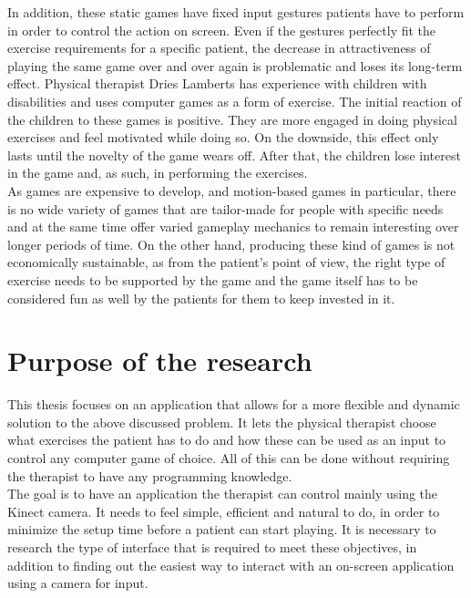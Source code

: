 In addition, these static games have fixed input gestures patients have to perform in order to control the action on screen. Even if the gestures perfectly fit the exercise requirements for a specific patient, the decrease in attractiveness of playing the same game over and over again is problematic and loses its long-term effect. Physical therapist Dries Lamberts has experience with children with disabilities and uses computer games as a form of exercise. The initial reaction of the children to these games is positive. They are more engaged in doing physical exercises and feel motivated while doing so. On the downside, this effect only lasts until the novelty of the game wears off. After that, the children lose interest in the game and, as such, in performing the exercises.\\

As games are expensive to develop, and motion-based games in particular, there is no wide variety of games that are tailor-made for people with specific needs and at the same time offer varied gameplay mechanics to remain interesting over longer periods of time. On the other hand, producing these kind of games is not economically sustainable, as from the patient's point of view, the right type of exercise needs to be supported by the game and the game itself has to be considered fun as well by the patients for them to keep invested in it.\\


\section{Purpose of the research}

This thesis focuses on an application that allows for a more flexible and dynamic solution to the above discussed problem. It lets the physical therapist choose what exercises the patient has to do and how these can be used as an input to control any computer game of choice. All of this can be done without requiring the therapist to have any programming knowledge.\\

The goal is to have an application the therapist can control mainly using the Kinect camera. It needs to feel simple, efficient and natural to do, in order to minimize the setup time before a patient can start playing. It is necessary to research the type of interface that is required to meet these objectives, in addition to finding out the easiest way to interact with an on-screen application using a camera for input.